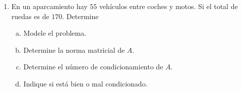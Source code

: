 \documentclass[
	spanish,
	9pt,
	utf8,
	xcolor=table,
	handout,
	aspectratio=1610,
	professionalfonts,
	notheorems,
	mathserif,
]{beamer}
\newcounter{savedenum}
\newcommand*{\saveenum}{\setcounter{savedenum}{\theenumi}}
\begin{document}
\begin{frame}
\begin{enumerate}
		      \begin{multicols}{3}
			      \begin{enumerate}[a)]
				      \item

				            $f\left(x\right)=\dfrac{x}{4}$, $n=1$.

				      \item

				            $f\left(x\right)=\sqrt{x}$, $n=1$.

				      \item

				            $f\left(x_{1},x_{2}\right)=x_{1}\cdot x_{2}$, $n=2$.
			      \end{enumerate}
		      \end{multicols}

		      Determine el número de condición.

		\item
		      En un aparcamiento hay $55$ vehículos entre coches y motos.
		      Si el total de ruedas es de $170$.
		      Determine

		      \begin{multicols}{2}
			      \begin{enumerate}[a)]
				      \item
				            Modele el problema.

				      \item
				            Determine la norma matricial de $A$.



				      \item
				            Determine el número de condicionamiento de $A$.

				      \item
				            Indique si está bien o mal condicionado.
			      \end{enumerate}
		      \end{multicols}

		      \

		      \saveenum
	\end{enumerate}
\end{frame}
\end{document}
